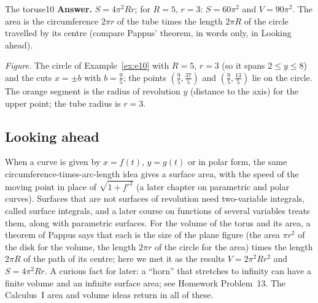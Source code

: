 \documentclass[11pt]{article}
\begin{document}
\begin{exmp}{The torus}{e10}
\textbf{Answer.} $S=4\pi^2Rr$; for $R=5$, $r=3$: $S=60\pi^2$ and $V=90\pi^2$. The area is the circumference $2\pi r$ of the tube times the length $2\pi R$ of the circle travelled by its centre (compare Pappus' theorem, in words only, in Looking ahead).
\begin{center}
\par\small\emph{Figure.} The circle of Example~\ref{ex:e10} with $R=5$, $r=3$ (so it spans $2\le y\le8$) and the cuts $x=\pm b$ with $b=\frac95$; the points $(\frac95,\frac{37}5)$ and $(\frac95,\frac{13}5)$ lie on the circle. The orange segment is the radius of revolution $y$ (distance to the axis) for the upper point; the tube radius is $r=3$.
\end{center}
\end{exmp}

\subsection*{Looking ahead}

When a curve is given by $x=f(t)$, $y=g(t)$ or in polar form, the same circumference-times-arc-length idea gives a surface area, with the speed of the moving point in place of $\sqrt{1+f'^2}$ (a later chapter on parametric and polar curves). Surfaces that are not surfaces of revolution need two-variable integrals, called surface integrals, and a later course on functions of several variables treats them, along with parametric surfaces. For the volume of the torus and its area, a theorem of Pappus says that each is the size of the plane figure (the area $\pi r^2$ of the disk for the volume, the length $2\pi r$ of the circle for the area) times the length $2\pi R$ of the path of its centre; here we met it as the results $V=2\pi^2Rr^2$ and $S=4\pi^2Rr$. A curious fact for later: a ``horn'' that stretches to infinity can have a finite volume and an infinite surface area; see Homework Problem~13. The Calculus~I area and volume ideas return in all of these.
\end{document}
